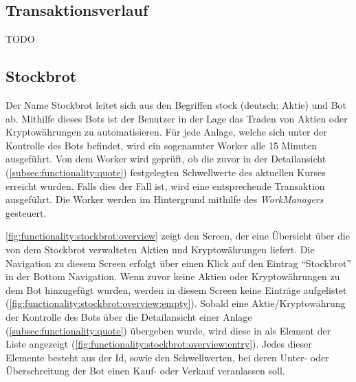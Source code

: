\documentclass[a4paper]{article}
\begin{document}
\subsection{Transaktionsverlauf}
\label{subsec:functionality:history}
TODO


\subsection{Stockbrot}
\label{subsec:functionality:stockbrot}
Der Name Stockbrot leitet sich aus den Begriffen stock (deutsch: Aktie) und Bot ab. Mithilfe dieses Bots ist der Benutzer in der Lage das Traden von Aktien oder Kryptowährungen zu automatisieren. Für jede Anlage, welche sich unter der Kontrolle des Bots befindet, wird ein sogenannter Worker alle 15 Minuten ausgeführt. Von dem Worker wird geprüft, ob die zuvor in der Detailansicht (\autoref{subsec:functionality:quote}) festgelegten Schwellwerte des aktuellen Kurses erreicht wurden. Falls dies der Fall ist, wird eine entsprechende Transaktion ausgeführt. Die Worker werden im Hintergrund mithilfe des \textit{WorkManagers} gesteuert.

\autoref{fig:functionality:stockbrot:overview} zeigt den Screen, der eine Übersicht über die von dem Stockbrot verwalteten Aktien und Kryptowährungen liefert. Die Navigation zu diesem Screen erfolgt über einen Klick auf den Eintrag "`Stockbrot"' in der Bottom Navigation. Wenn zuvor keine Aktien oder Kryptowährungen zu dem Bot hinzugefügt wurden, werden in diesem Screen keine Einträge aufgelistet (\autoref{fig:functionality:stockbrot:overview:empty}). Sobald eine Aktie/Kryptowährung der Kontrolle des Bots über die Detailansicht einer Anlage (\autoref{subsec:functionality:quote}) übergeben wurde, wird diese in als Element der Liste angezeigt (\autoref{fig:functionality:stockbrot:overview:entry}). Jedes dieser Elemente besteht aus der Id, sowie den Schwellwerten, bei deren Unter- oder Überschreitung der Bot einen Kauf- oder Verkauf veranlassen soll.
\end{document}
